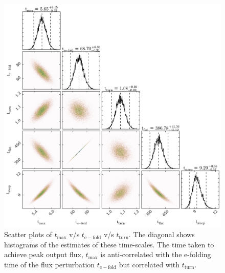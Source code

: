 \documentclass[a4paper,fleqn,usenatbib]{mnras}
\begin{document}
\begin{figure}
    \includegraphics[width=\textwidth]{images/Zw229-15_Times.jpg}
    \caption{Scatter plots of $t_{\mathrm{max}}$ v/s $t_{\mathrm{e-fold}}$ v/s $t_{\mathrm{turn}}$. The diagonal shows histograms of the estimates of these time-scales. The time taken to achieve peak output flux, $t_{\mathrm{max}}$ is anti-correlated with the e-folding time of the flux perturbation $t_{\mathrm{e-fold}}$ but correlated with $t_{\mathrm{turn}}$.}  
    \label{fig:Zw229-15_times}
\end{figure}
\end{document}
